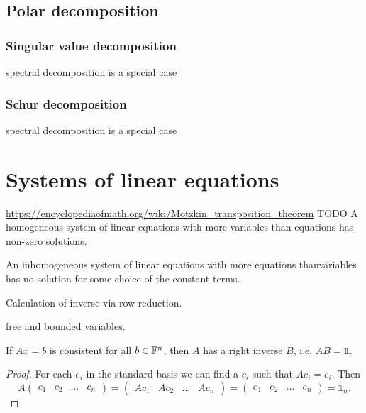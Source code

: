 \subsection{Polar decomposition}
\subsubsection{Singular value decomposition}
spectral decomposition is a special case
\subsubsection{Schur decomposition}
spectral decomposition is a special case




\section{Systems of linear equations}
\url{https://encyclopediaofmath.org/wiki/Motzkin_transposition_theorem}
TODO
A homogeneous system of linear equations with more variables than equations has non-zero solutions.

An inhomogeneous system of linear equations with more equations thanvariables has no solution for some choice of the constant terms.

Calculation of inverse via row reduction.

free and bounded variables.

\begin{lemma}
If $Ax=b$ is consistent for all $b\in \mathbb{F}^n$, then $A$ has a right inverse $B$, i.e. $AB = \mathbb{1}$.
\end{lemma}
\begin{proof}
For each $e_i$ in the standard basis we can find a $c_i$ such that $Ac_i = e_i$. Then
\[ A \begin{pmatrix}
c_1 & c_2 & \hdots & c_n
\end{pmatrix} = \begin{pmatrix}
Ac_1 & Ac_2 & \hdots & Ac_n
\end{pmatrix} = \begin{pmatrix}
e_1 & e_2 & \hdots & e_n
\end{pmatrix} = \mathbb{1}_n. \]
\end{proof}

